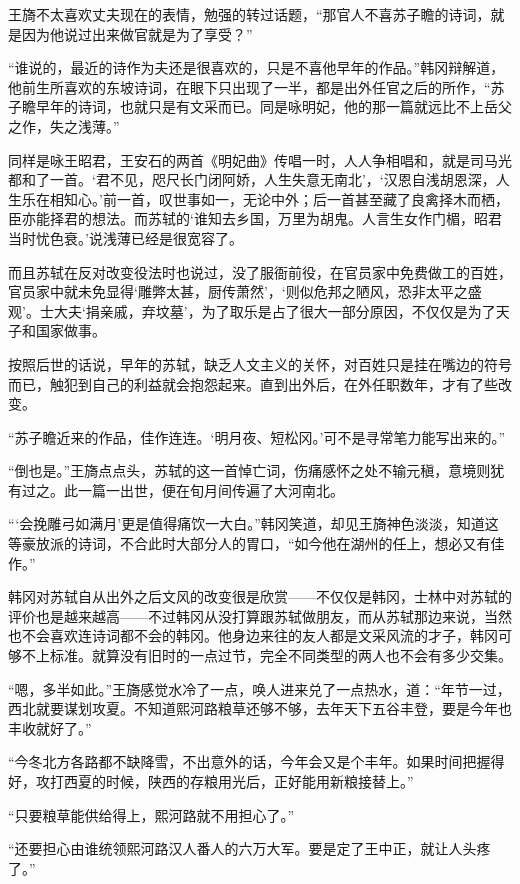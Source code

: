 王旖不太喜欢丈夫现在的表情，勉强的转过话题，“那官人不喜苏子瞻的诗词，就是因为他说过出来做官就是为了享受？”

“谁说的，最近的诗作为夫还是很喜欢的，只是不喜他早年的作品。”韩冈辩解道，他前生所喜欢的东坡诗词，在眼下只出现了一半，都是出外任官之后的所作，“苏子瞻早年的诗词，也就只是有文采而已。同是咏明妃，他的那一篇就远比不上岳父之作，失之浅薄。”

同样是咏王昭君，王安石的两首《明妃曲》传唱一时，人人争相唱和，就是司马光都和了一首。‘君不见，咫尺长门闭阿娇，人生失意无南北’，‘汉恩自浅胡恩深，人生乐在相知心。’前一首，叹世事如一，无论中外；后一首甚至藏了良禽择木而栖，臣亦能择君的想法。而苏轼的‘谁知去乡国，万里为胡鬼。人言生女作门楣，昭君当时忧色衰。’说浅薄已经是很宽容了。

而且苏轼在反对改变役法时也说过，没了服衙前役，在官员家中免费做工的百姓，官员家中就未免显得‘雕弊太甚，厨传萧然’，‘则似危邦之陋风，恐非太平之盛观’。士大夫‘捐亲戚，弃坟墓’，为了取乐是占了很大一部分原因，不仅仅是为了天子和国家做事。

按照后世的话说，早年的苏轼，缺乏人文主义的关怀，对百姓只是挂在嘴边的符号而已，触犯到自己的利益就会抱怨起来。直到出外后，在外任职数年，才有了些改变。

“苏子瞻近来的作品，佳作连连。‘明月夜、短松冈。’可不是寻常笔力能写出来的。”

“倒也是。”王旖点点头，苏轼的这一首悼亡词，伤痛感怀之处不输元稹，意境则犹有过之。此一篇一出世，便在旬月间传遍了大河南北。

“‘会挽雕弓如满月’更是值得痛饮一大白。”韩冈笑道，却见王旖神色淡淡，知道这等豪放派的诗词，不合此时大部分人的胃口，“如今他在湖州的任上，想必又有佳作。”

韩冈对苏轼自从出外之后文风的改变很是欣赏——不仅仅是韩冈，士林中对苏轼的评价也是越来越高——不过韩冈从没打算跟苏轼做朋友，而从苏轼那边来说，当然也不会喜欢连诗词都不会的韩冈。他身边来往的友人都是文采风流的才子，韩冈可够不上标准。就算没有旧时的一点过节，完全不同类型的两人也不会有多少交集。

“嗯，多半如此。”王旖感觉水冷了一点，唤人进来兑了一点热水，道：“年节一过，西北就要谋划攻夏。不知道熙河路粮草还够不够，去年天下五谷丰登，要是今年也丰收就好了。”

“今冬北方各路都不缺降雪，不出意外的话，今年会又是个丰年。如果时间把握得好，攻打西夏的时候，陕西的存粮用光后，正好能用新粮接替上。”

“只要粮草能供给得上，熙河路就不用担心了。”

“还要担心由谁统领熙河路汉人番人的六万大军。要是定了王中正，就让人头疼了。”

